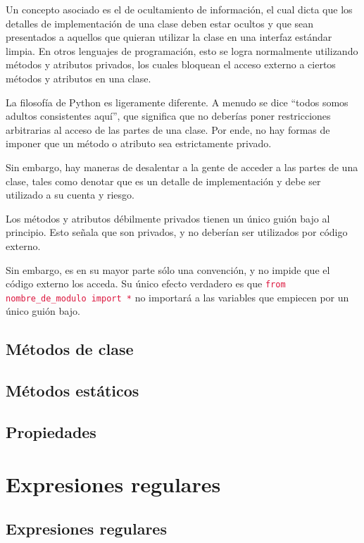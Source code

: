 \documentclass{report}
\newcommand{\doble}[1]{``#1''}
\newcommand{\ttt}[1]{
  \textcolor{Crimson}{\texttt{#1}}
}
\begin{document}
Un concepto asociado es el de ocultamiento de información, el cual dicta que los detalles de implementación de una clase deben estar ocultos y que sean presentados a aquellos que quieran utilizar la clase en una interfaz estándar limpia. En otros lenguajes de programación, esto se logra normalmente utilizando métodos y atributos privados, los cuales bloquean el acceso externo a ciertos métodos y atributos en una clase.\smallskip

La filosofía de Python es ligeramente diferente. A menudo se dice \doble{todos somos adultos consistentes aquí}, que significa que no deberías poner restricciones arbitrarias al acceso de las partes de una clase. Por ende, no hay formas de imponer que un método o atributo sea estrictamente privado.\smallskip

Sin embargo, hay maneras de desalentar a la gente de acceder a las partes de una clase, tales como denotar que es un detalle de implementación y debe ser utilizado a su cuenta y riesgo.\smallskip

Los métodos y atributos débilmente privados tienen un único guión bajo al principio. Esto señala que son privados, y no deberían ser utilizados por código externo.\smallskip

Sin embargo, es en su mayor parte sólo una convención, y no impide que el código externo los acceda. Su único efecto verdadero es que \ttt{from nombre\_de\_modulo import *} no importará a las variables que empiecen por un único guión bajo.

\section{Métodos de clase}

\section{Métodos estáticos}

\section{Propiedades}

\clearpage\chapter{Expresiones regulares}

\section{Expresiones regulares}
\end{document}
